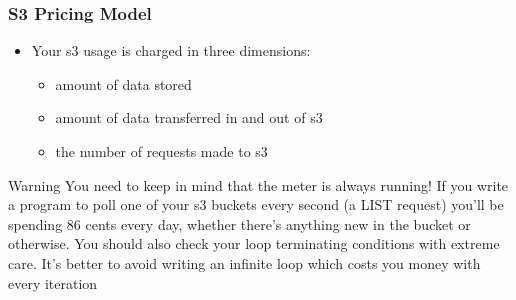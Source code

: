 \documentclass{beamer}
\begin{document}
\begin{frame}[fragile]
\frametitle{S3 Pricing Model}
\begin{itemize}
\item Your \acrshort{s3} usage is charged in three dimensions:
\begin{itemize}
\item amount of data stored
\item amount of data transferred in and out of \acrshort{s3}
\item the number of requests made to \acrshort{s3}
\end{itemize}
\end{itemize}

\begin{alertblock}{Warning}
You need to keep in mind that the meter is always running! If you write a program
to poll one of your \acrshort{s3} buckets every second (a LIST request) you’ll be spending
86 cents every day, whether there’s anything new in the bucket or otherwise. You
should also check your loop terminating conditions with extreme care. It’s better
to avoid writing an infinite loop which costs you money with every iteration
\end{alertblock}

\end{frame}
\end{document}
